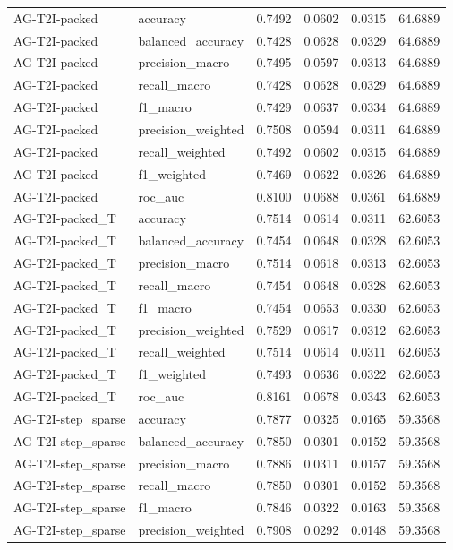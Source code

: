 \begin{tabular}{llrrrr}
AG-T2I-packed & accuracy & 0.7492 & 0.0602 & 0.0315 & 64.6889 \\
AG-T2I-packed & balanced_accuracy & 0.7428 & 0.0628 & 0.0329 & 64.6889 \\
AG-T2I-packed & precision_macro & 0.7495 & 0.0597 & 0.0313 & 64.6889 \\
AG-T2I-packed & recall_macro & 0.7428 & 0.0628 & 0.0329 & 64.6889 \\
AG-T2I-packed & f1_macro & 0.7429 & 0.0637 & 0.0334 & 64.6889 \\
AG-T2I-packed & precision_weighted & 0.7508 & 0.0594 & 0.0311 & 64.6889 \\
AG-T2I-packed & recall_weighted & 0.7492 & 0.0602 & 0.0315 & 64.6889 \\
AG-T2I-packed & f1_weighted & 0.7469 & 0.0622 & 0.0326 & 64.6889 \\
AG-T2I-packed & roc_auc & 0.8100 & 0.0688 & 0.0361 & 64.6889 \\
AG-T2I-packed_T & accuracy & 0.7514 & 0.0614 & 0.0311 & 62.6053 \\
AG-T2I-packed_T & balanced_accuracy & 0.7454 & 0.0648 & 0.0328 & 62.6053 \\
AG-T2I-packed_T & precision_macro & 0.7514 & 0.0618 & 0.0313 & 62.6053 \\
AG-T2I-packed_T & recall_macro & 0.7454 & 0.0648 & 0.0328 & 62.6053 \\
AG-T2I-packed_T & f1_macro & 0.7454 & 0.0653 & 0.0330 & 62.6053 \\
AG-T2I-packed_T & precision_weighted & 0.7529 & 0.0617 & 0.0312 & 62.6053 \\
AG-T2I-packed_T & recall_weighted & 0.7514 & 0.0614 & 0.0311 & 62.6053 \\
AG-T2I-packed_T & f1_weighted & 0.7493 & 0.0636 & 0.0322 & 62.6053 \\
AG-T2I-packed_T & roc_auc & 0.8161 & 0.0678 & 0.0343 & 62.6053 \\
AG-T2I-step_sparse & accuracy & 0.7877 & 0.0325 & 0.0165 & 59.3568 \\
AG-T2I-step_sparse & balanced_accuracy & 0.7850 & 0.0301 & 0.0152 & 59.3568 \\
AG-T2I-step_sparse & precision_macro & 0.7886 & 0.0311 & 0.0157 & 59.3568 \\
AG-T2I-step_sparse & recall_macro & 0.7850 & 0.0301 & 0.0152 & 59.3568 \\
AG-T2I-step_sparse & f1_macro & 0.7846 & 0.0322 & 0.0163 & 59.3568 \\
AG-T2I-step_sparse & precision_weighted & 0.7908 & 0.0292 & 0.0148 & 59.3568 \\

\end{tabular}
